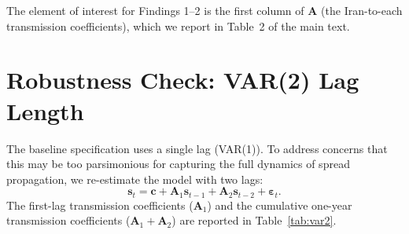 \documentclass[12pt,a4paper]{article}
\begin{document}
The element of interest for Findings 1--2 is the first column of $\mathbf{A}$ (the Iran-to-each transmission coefficients), which we report in Table~2 of the main text.



\section{Robustness Check: VAR(2) Lag Length}
\label{app:var2}

The baseline specification uses a single lag (VAR(1)). To address concerns that this may be too parsimonious for capturing the full dynamics of spread propagation, we re-estimate the model with two lags:
\begin{equation}
\mathbf{s}_t = \mathbf{c} + \mathbf{A}_1 \mathbf{s}_{t-1} + \mathbf{A}_2 \mathbf{s}_{t-2} + \boldsymbol{\varepsilon}_t.
\end{equation}
The first-lag transmission coefficients ($\mathbf{A}_1$) and the cumulative one-year transmission coefficients ($\mathbf{A}_1 + \mathbf{A}_2$) are reported in Table~\ref{tab:var2}.
\end{document}
